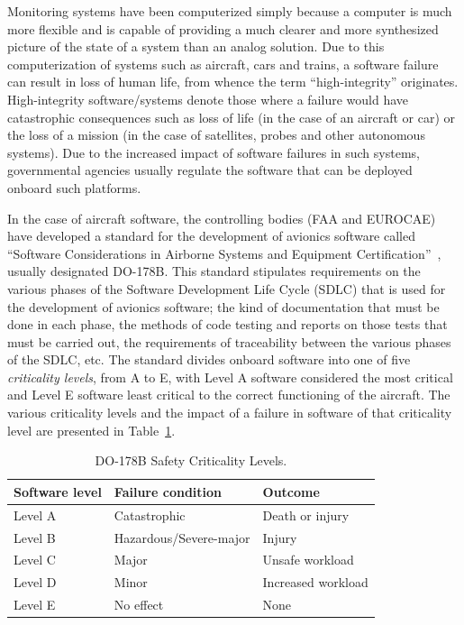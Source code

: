 Monitoring systems have been computerized simply because a computer is
much more flexible and is capable of providing a much clearer and more
synthesized picture of the state of a system than an analog
solution. Due to this computerization of systems such as aircraft,
cars and trains, a software failure can result in loss of human life,
from whence the term ``high-integrity'' originates. High-integrity
software/systems denote those where a failure would have catastrophic
consequences such as loss of life (in the case of an aircraft or car)
or the loss of a mission (in the case of satellites, probes and other
autonomous systems). Due to the increased impact of software failures
in such systems, governmental agencies usually regulate the software
that can be deployed onboard such platforms.

In the case of aircraft software, the controlling bodies (FAA and
EUROCAE) have developed a standard for the development of avionics
software called ``Software Considerations in Airborne Systems and
Equipment Certification''~\cite{do178b}, usually designated
DO-178B. This standard stipulates requirements on the various phases
of the Software Development Life Cycle (SDLC) that is used for the
development of avionics software; the kind of documentation that must
be done in each phase, the methods of code testing and reports on
those tests that must be carried out, the requirements of traceability
between the various phases of the SDLC, etc. The standard divides
onboard software into one of five \emph{criticality levels}, from A to
E, with Level A software considered the most critical and Level E
software least critical to the correct functioning of the
aircraft. The various criticality levels and the impact of a failure
in software of that criticality level are presented in
Table~\ref{tab:criticality_levels}.

\begin{table}
\centering
\begin{tabular}{|l|l|l|}
\hline
\textbf{Software level}&\textbf{Failure condition}&\textbf{Outcome}\\
\hline
Level A & Catastrophic & Death or injury\\
Level B & Hazardous/Severe-major & Injury\\
Level C & Major & Unsafe workload\\
Level D & Minor & Increased workload\\
Level E & No effect & None\\
\hline
\end{tabular}
\caption{DO-178B Safety Criticality Levels.}
\label{tab:criticality_levels}
\end{table}

